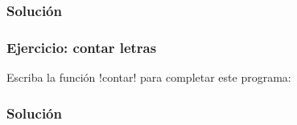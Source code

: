 \documentclass[12pt]{beamer}
\begin{document}
  \begin{frame}
    \label{solucion-binomial}
    \frametitle{Solución}
    
  \end{frame}

  \begin{frame}
    \label{ejercicio-contar-letras}
    \frametitle{Ejercicio: contar letras}
    Escriba la función \li!contar! para completar este programa:
    \footnotesize
    
    
  \end{frame}

  \begin{frame}
    \label{solucion-contar-letras}
    \frametitle{Solución}
    
  \end{frame}
\end{document}
